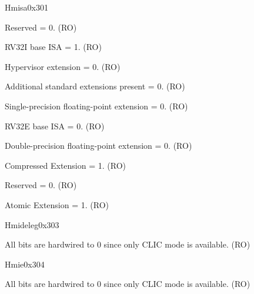 \begin{register}{H}{misa}{0x301}
\begin{regdesc}
\begin{reglist}
\label{fielddesc:MISAJ}\item [J] Reserved = 0.  (RO)
\label{fielddesc:MISAI}\item [I] RV32I base ISA = 1. (RO)
\label{fielddesc:MISAH}\item [H] Hypervisor extension = 0. (RO)
\label{fielddesc:MISAG}\item [G] Additional standard extensions present = 0. (RO)
\label{fielddesc:MISAF}\item [F] Single-precision floating-point extension = 0. (RO)
\label{fielddesc:MISAE}\item [E] RV32E base ISA = 0. (RO)
\label{fielddesc:MISAD}\item [D] Double-precision floating-point extension = 0. (RO)
\label{fielddesc:MISAC}\item [C] Compressed Extension = 1. (RO)
\label{fielddesc:MISAB}\item [B] Reserved = 0. (RO)
\label{fielddesc:MISAA}\item [A] Atomic Extension = 1. (RO)
\end{reglist}\end{regdesc}
\end{register}

\begin{register}{H}{mideleg}{0x303}\label{regdesc:MIDELEG_REG}
%
\regnewline%
\begin{regdesc}\begin{reglist}
\label{fielddesc:MIDELEG}\item [{mideleg}] All bits are hardwired to 0 since only CLIC mode is available. (RO)
\end{reglist}\end{regdesc}
\end{register}

\begin{register}{H}{mie}{0x304}\label{regdesc:MIE_REG}
%
\regnewline%
\begin{regdesc}\begin{reglist}
\label{fielddesc:MIE}\item [{mie}] All bits are hardwired to 0 since only CLIC mode is available. (RO)
\end{reglist}\end{regdesc}
\end{register}

